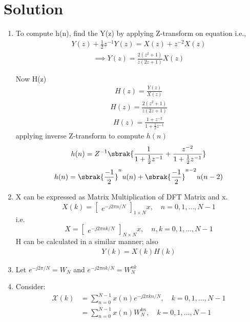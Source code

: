\documentclass[journal,12pt,twocolumn]{IEEEtran}
\renewcommand\thesection{\arabic{section}}
\begin{document}
\section{Solution}
\begin{enumerate}[label=\thesection.\arabic*.,ref=\thesection.\theenumi]
\item
To compute h(n), find the Y(z) by applying Z-transform on equation i.e.,
\begin{align}
    Y(z) + \frac{1}{2}z^{-1}Y(z)=X(z) + z^{-2}X(z)
\end{align}
\begin{align}
    \implies Y(z)=\frac{2(z^2+1)}{z(2z+1)}X(z)
\end{align}

Now H(z)
\begin{align}
    H(z) = \frac{Y(z)}{X(z)}
\end{align}
\begin{align}
 H(z) = \frac{2(z^2+1)}{z(2z+1)}
\end{align}
\begin{align}
 H(z) = \frac{1+z^{-2}}{1+\frac{1}{2}z^{-1}}
\end{align}
applying inverse Z-transform to compute $h(n)$
\begin{align}
 h(n)= Z^{-1}\sbrak{\frac{1}{1+\frac{1}{2}z^{-1}} + \frac{z^{-2}}{1+\frac{1}{2}z^{-1}}}
\end{align}
\begin{align}
 h(n)=\sbrak{\frac{-1}{2}}^nu(n) + \sbrak{\frac{-1}{2}}^{n-2}u(n-2)
\end{align}

\item 
X can be expressed as Matrix Multiplication of DFT Matrix and x.
\begin{equation}
X(k) = 
\begin{bmatrix}
e^{-j2\pi n/N}
\end{bmatrix}_{1 \times N}
x, \quad n = 0,1, \ldots, N-1
\end{equation}
i.e.
\begin{equation}
X = 
\begin{bmatrix}
e^{-j2\pi nk/N}
\end{bmatrix}_{N \times N}
x, \quad n, k = 0,1, \ldots, N-1
\end{equation}
H can be calculated in a similar manner; also 
    \begin{align}
    Y(k) = X(k)H(k)
    \end{align}
\item
Let $e^{-j2\pi/N} = W_{N}$ and $e^{-j2\pi nk/N} = W^{nk}_{N}$ 
\bigskip
\item 
Consider:
    \begin{align}
       \mathcal X(k) &=  \sum_{n=0}^{N-1} x(n)e^{-j2\pi kn/N}, \quad k=0,1, \ldots, N-1 \\
       &= \sum_{n=0}^{N-1} x(n)W^{kn}_{N}, \quad k=0,1, \ldots, N-1
    \end{align}


\end{enumerate}
\end{document}
